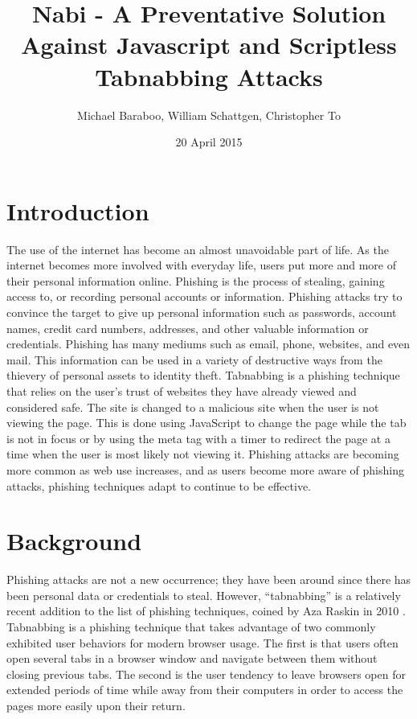 \documentclass[12pt]{article}
\title{Nabi - A Preventative Solution Against Javascript and Scriptless Tabnabbing Attacks}
\author{Michael Baraboo, William Schattgen, Christopher To}
\date{20 April 2015}
\begin{document}
\maketitle

\thispagestyle{empty}

\begin{abstract}
  
\end{abstract}

\begin{doublespace}

\section{Introduction}
The use of the internet has become an almost unavoidable part of life. As the internet becomes more involved with everyday life, users put more and more of their personal information online. Phishing is the process of stealing, gaining access to, or recording personal accounts or information. Phishing attacks try to convince the target to give up personal information such as passwords, account names, credit card numbers, addresses, and other valuable information or credentials. Phishing has many mediums such as email, phone, websites, and even mail. This information can be used in a variety of destructive ways from the thievery of personal assets to identity theft. Tabnabbing is a phishing technique that relies on the user’s trust of websites they have already viewed and considered safe. The site is changed to a malicious site when the user is not viewing the page. This is done using JavaScript to change the page while the tab is not in focus or by using the meta tag with a timer to redirect the page at a time when the user is most likely not viewing it. Phishing attacks are becoming more common as web use increases, and as users become more aware of phishing attacks, phishing techniques adapt to continue to be effective.

\section{Background}
Phishing attacks are not a new occurrence; they have been around since there has been personal data or credentials to steal. However, ``tabnabbing'' is a relatively recent addition to the list of phishing techniques, coined by Aza Raskin in 2010 \cite{Raskin}. Tabnabbing is a phishing technique that takes advantage of two commonly exhibited user behaviors for modern browser usage. The first is that users often open several tabs in a browser window and navigate between them without closing previous tabs. The second is the user tendency to leave browsers open for extended periods of time while away from their computers in order to access the pages more easily upon their return. 


\end{doublespace}
\end{document}
